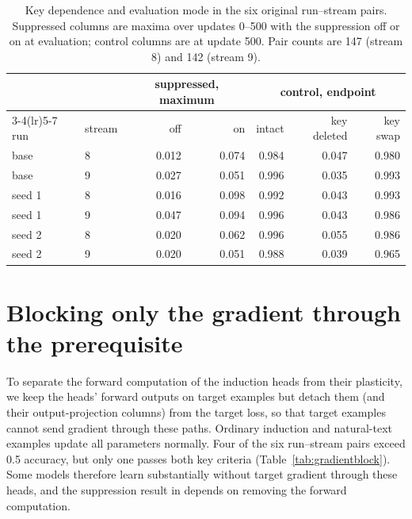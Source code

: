 \begin{table}[!htbp]
\centering\small
\caption{Key dependence and evaluation mode in the six original run--stream pairs. Suppressed
columns are maxima over updates 0--500 with the suppression off or on at
evaluation; control columns are at update 500. Pair counts are 147 (stream 8) and
142 (stream 9).}
\label{tab:r6}
\begin{tabular}{llrrrrr}\toprule
 & & \multicolumn{2}{c}{suppressed, maximum} & \multicolumn{3}{c}{control, endpoint} \\
\cmidrule(lr){3-4}\cmidrule(lr){5-7}
run & stream & off & on & intact & key deleted & key swap \\\midrule
base & 8 & 0.012 & 0.074 & 0.984 & 0.047 & 0.980 \\
base & 9 & 0.027 & 0.051 & 0.996 & 0.035 & 0.993 \\
seed 1 & 8 & 0.016 & 0.098 & 0.992 & 0.043 & 0.993 \\
seed 1 & 9 & 0.047 & 0.094 & 0.996 & 0.043 & 0.986 \\
seed 2 & 8 & 0.020 & 0.062 & 0.996 & 0.055 & 0.986 \\
seed 2 & 9 & 0.020 & 0.051 & 0.988 & 0.039 & 0.965 \\
\bottomrule\end{tabular}
\end{table}

\section{Blocking only the gradient through the prerequisite}
\label{app:gradientblock}
To separate the forward computation of the induction heads from their plasticity,
we keep the heads' forward outputs on target examples but detach them (and their
output-projection columns) from the target loss, so that target examples cannot
send gradient through these paths. Ordinary induction and natural-text examples
update all parameters normally. Four of the six run--stream pairs exceed 0.5
accuracy, but only one passes both key criteria (Table~\ref{tab:gradientblock}).
Some models therefore learn substantially without target gradient through these
heads, and the suppression result in  depends on removing the
forward computation.

